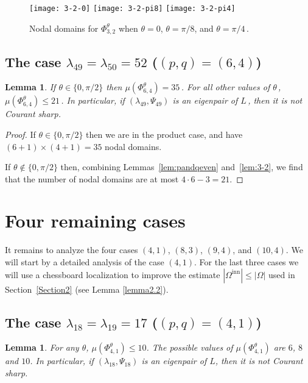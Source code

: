 \documentclass[a4paper,reqno,11pt]{amsart}
\newtheorem{lemma}[thm]{Lemma}
\theoremstyle{remark}
\theoremstyle{definition}
\numberwithin{equation}{section}
\begin{document}
\begin{figure}[htp]
\centering
\texttt{[image: 3-2-0]}
\hskip 0.5cm
\texttt{[image: 3-2-pi8]}
\hskip 0.5cm
\texttt{[image: 3-2-pi4]}
\caption{Nodal domains for $\Phi_{3,2}^\theta $ when $\theta=0$, $\theta=\pi/8$, and $\theta=\pi/4\,$.}
\label{fig:3-2}
\end{figure}

\subsection{The case $\lambda_{49}=\lambda_{50}=52$ ($(p,q)=(6,4)$)}

\begin{lemma}
\label{lem:6-4}
If $\theta\in\{0,\pi/2\}$ then $\mu(\Phi_{6,4}^\theta)=35\,$. For all other values 
of $\theta\,$, $\mu(\Phi_{6,4}^\theta)\leq 21\,$. In particular, if 
$(\lambda_{49},\Psi_{49})$ is an eigenpair of $L\,$, then it is not Courant sharp.
\end{lemma}

\begin{proof}
If $\theta\in\{0,\pi/2\}$ then we are in the product case, and have 
$(6+1)\times(4+1)=35$ nodal domains.

If $\theta\not\in\{0,\pi/2\}$ then, combining Lemmas~\ref{lem:pandqeven} 
and~\ref{lem:3-2}, we find that the number of nodal domains are at most 
$4\cdot 6-3=21$.
\end{proof}

\section{Four remaining cases}
\label{Section7}

It remains to analyze the four cases $(4,1)$, $(8,3)$, $(9,4)$, and $(10,4)$. 
We will start by a detailed analysis of the case $(4,1)$. For the last three
cases we will use a chessboard localization to improve the estimate
$|\Omega^{\text{inn}}|\leq|\Omega|$ used in Section~\ref{Section2} 
(see Lemma \ref{lemma2.2}).

\subsection{The case $\lambda_{18}=\lambda_{19}=17$ ($(p,q)=(4,1)$)}

\begin{lemma}
\label{lem:4-1}
For any $\theta$, $\mu(\Phi_{4,1}^\theta)\leq 10$. The possible values 
of $\mu(\Phi_{4,1}^\theta)$ are $6$, $8$ and $10$. In particular, if 
$(\lambda_{18},\Psi_{18})$ is an eigenpair of $L$, then it is not Courant sharp.
\end{lemma}
\end{document}
